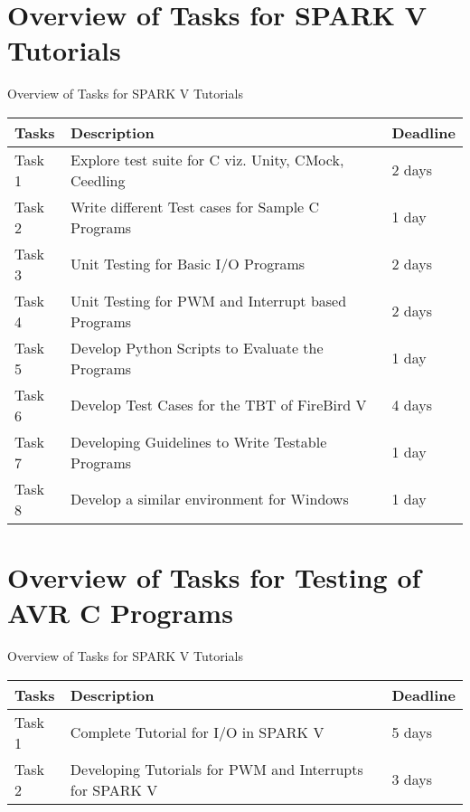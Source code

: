 \documentclass[10pt, a4paper]{beamer}
\begin{document}
\section{Overview of Tasks for SPARK V Tutorials}
\begin{frame}{Overview of Tasks for SPARK V Tutorials}
	\begin{center}
	\begin{tabular}{ |p{2cm}|p{5cm}|p{1.5cm}| }
	\hline
 	 Tasks & Description & Deadline \\
	\hline
 	 Task 1 & Explore test suite for C viz. Unity, CMock, Ceedling & 2 days \\ 
	\hline
	 Task 2 & Write different Test cases for Sample C Programs & 1 day \\ 
	\hline
	 Task 3 & Unit Testing for Basic I/O Programs & 2 days \\ 
	\hline
	 Task 4 & Unit Testing for PWM and Interrupt based Programs & 2 days \\ 
	\hline
	 Task 5 & Develop Python Scripts to Evaluate the Programs & 1 day \\ 
	\hline
	 Task 6 & Develop Test Cases for the TBT of FireBird V & 4 days \\ 
	\hline
 	 Task 7 & Developing Guidelines to Write Testable Programs & 1 day \\
	\hline
	 Task 8 & Develop a similar environment for Windows & 1 day \\
	\hline
	\end{tabular}
	\end{center}
\end{frame}


\section{Overview of Tasks for Testing of AVR C Programs}
\begin{frame}{Overview of Tasks for SPARK V Tutorials}
	\begin{center}
	\begin{tabular}{ |p{2cm}|p{5cm}|p{1.5cm}| }
	\hline
 	 Tasks & Description & Deadline \\
	\hline
 	 Task 1 & Complete Tutorial for I/O in SPARK V & 5 days \\ 
	\hline
	 Task 2 & Developing Tutorials for PWM and Interrupts for SPARK V & 3 days \\ 
	\hline
	\end{tabular}
	\end{center}
\end{frame}
\end{document}
